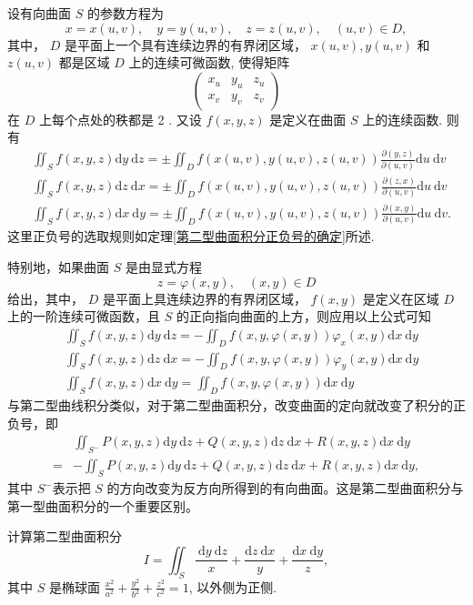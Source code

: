 设有向曲面 $S$ 的参数方程为
$$
x=x(u, v), \quad y=y(u, v), \quad z=z(u, v), \quad(u, v) \in D,
$$
其中， $D$ 是平面上一个具有连续边界的有界闭区域， $x(u, v), y(u, v)$ 和 $z(u, v)$ 都是区域 $D$ 上的连续可微函数, 使得矩阵
$$
\left(\begin{array}{lll}
x_u & y_u & z_u \\
x_v & y_v & z_v
\end{array}\right)
$$
在 $D$ 上每个点处的秩都是 2 . 又设 $f(x, y, z)$ 是定义在曲面 $S$ 上的连续函数. 则有
$$
\begin{aligned}
& \iint_S f(x, y, z) \mathrm{d} y \mathrm{~d} z= \pm \iint_D f(x(u, v), y(u, v), z(u, v)) \frac{\partial(y, z)}{\partial(u, v)} \mathrm{d} u \mathrm{~d} v \\
& \iint_S f(x, y, z) \mathrm{d} z \mathrm{~d} x= \pm \iint_D f(x(u, v), y(u, v), z(u, v)) \frac{\partial(z, x)}{\partial(u, v)} \mathrm{d} u \mathrm{~d} v \\
& \iint_S f(x, y, z) \mathrm{d} x \mathrm{~d} y= \pm \iint_D f(x(u, v), y(u, v), z(u, v)) \frac{\partial(x, y)}{\partial(u, v)} \mathrm{d} u \mathrm{~d} v .
\end{aligned}
$$
这里正负号的选取规则如定理\ref{第二型曲面积分正负号的确定}所述.

特别地，如果曲面 $S$ 是由显式方程
$$
z=\varphi(x, y), \quad(x, y) \in D
$$
给出，其中， $D$ 是平面上具连续边界的有界闭区域， $f(x, y)$ 是定义在区域 $D$ 上的一阶连续可微函数，且 $S$ 的正向指向曲面的上方，则应用以上公式可知
$$
\begin{aligned}
& \iint_S f(x, y, z) \mathrm{d} y \mathrm{~d} z=-\iint_D f(x, y, \varphi(x, y)) \varphi_x(x, y) \mathrm{d} x \mathrm{~d} y \\
& \iint_S f(x, y, z) \mathrm{d} z \mathrm{~d} x=-\iint_D f(x, y, \varphi(x, y)) \varphi_y(x, y) \mathrm{d} x \mathrm{~d} y \\
& \iint_S f(x, y, z) \mathrm{d} x \mathrm{~d} y=\iint_D f(x, y, \varphi(x, y)) \mathrm{d} x \mathrm{~d} y
\end{aligned}
$$
与第二型曲线积分类似，对于第二型曲面积分，改变曲面的定向就改变了积分的正负号，即
$$
\begin{aligned}
& \iint_{S^{-}} P(x, y, z) \mathrm{d} y \mathrm{~d} z+Q(x, y, z) \mathrm{d} z \mathrm{~d} x+R(x, y, z) \mathrm{d} x \mathrm{~d} y \\
= & -\iint_S P(x, y, z) \mathrm{d} y \mathrm{~d} z+Q(x, y, z) \mathrm{d} z \mathrm{~d} x+R(x, y, z) \mathrm{d} x \mathrm{~d} y,
\end{aligned}
$$
其中 $S^{-}$表示把 $S$ 的方向改变为反方向所得到的有向曲面。这是第二型曲面积分与第一型曲面积分的一个重要区别。
\begin{example}
计算第二型曲面积分
$$
I=\iint_S \frac{\mathrm{~d} y \mathrm{~d} z}{x}+\frac{\mathrm{d} z \mathrm{~d} x}{y}+\frac{\mathrm{d} x \mathrm{~d} y}{z},
$$
其中 $S$ 是椭球面 $\frac{x^2}{a^2}+\frac{y^2}{b^2}+\frac{z^2}{c^2}=1$, 以外侧为正侧.
\end{example}

